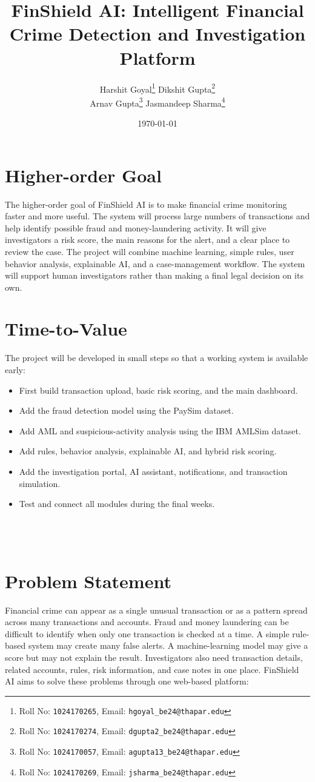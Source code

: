 \documentclass[11pt,a4paper]{article}
\title{FinShield AI: Intelligent Financial Crime Detection and Investigation Platform}
\author{
  Harshit Goyal\thanks{Roll No: \texttt{1024170265}, Email: \texttt{hgoyal\_be24@thapar.edu}}
  \qquad\qquad
  Dikshit Gupta\thanks{Roll No: \texttt{1024170274}, Email: \texttt{dgupta2\_be24@thapar.edu}}
  \\
  Arnav Gupta\thanks{Roll No: \texttt{1024170057}, Email: \texttt{agupta13\_be24@thapar.edu}}
  \qquad
  Jasmandeep Sharma\thanks{Roll No: \texttt{1024170269}, Email: \texttt{jsharma\_be24@thapar.edu}}
}
\date{\AdvanceDate[1]\today}
\begin{document}
\maketitle


\section{Higher-order Goal%
  }
The higher-order goal of FinShield AI is to make financial crime monitoring faster and
more useful. The system will process large numbers of transactions and help identify
possible fraud and money-laundering activity. It will give investigators a risk score, the
main reasons for the alert, and a clear place to review the case. The project will combine machine learning, simple rules, user behavior analysis, explainable AI, and a case-management workflow. The system will support human investigators rather than making a final legal decision on its own.


\section{Time-to-Value}

The project will be developed in small steps so that a working system is available early:

\begin{itemize}[leftmargin=0.7cm]
    \item First build transaction upload, basic risk scoring, and the main dashboard.
    \item Add the fraud detection model using the PaySim dataset.
    \item Add AML and suspicious-activity analysis using the IBM AMLSim dataset.
    \item Add rules, behavior analysis, explainable AI, and hybrid risk scoring.
    \item Add the investigation portal, AI assistant, notifications, and transaction simulation.
    \item Test and connect all modules during the final weeks.
    \\
    \\
    \\
    \\
\end{itemize}


\section{Problem Statement}Financial crime can appear as a single unusual transaction or as a pattern spread across
many transactions and accounts. Fraud and money laundering can be difficult to identify
when only one transaction is checked at a time.
A simple rule-based system may create many false alerts. A machine-learning model
may give a score but may not explain the result. Investigators also need transaction
details, related accounts, rules, risk information, and case notes in one place.
FinShield AI aims to solve these problems through one web-based platform:
\end{document}

